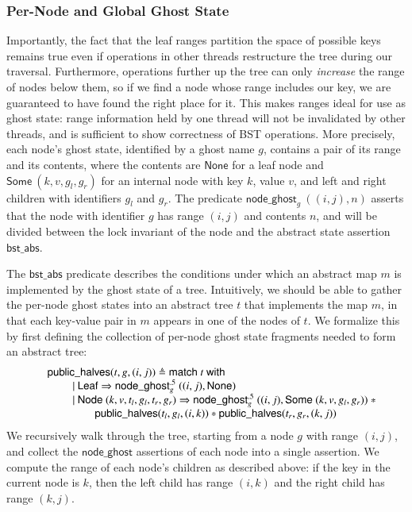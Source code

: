 \documentclass[runningheads]{llncs}
\newcommand{\treerep}{\ensuremath{\mathsf{bst\_abs}}}
\newcommand{\nodeghost}[2]{\ensuremath{\mathsf{node\_ghost}_{#1}\ (#2)}}
\newcommand{\publichalf}[2]{\ensuremath{\mathsf{node\_ghost}^{.5}_{#1}\ (#2)}}
\begin{document}
\subsubsection{Per-Node and Global Ghost State}
Importantly, the fact that the leaf ranges partition the space of possible keys remains true even if operations in other threads restructure the tree during our traversal. Furthermore, operations further up the tree can only \emph{increase} the range of nodes below them, so if we find a node whose range includes our key, we are guaranteed to have found the right place for it. This makes ranges ideal for use as ghost state: range information held by one thread will not be invalidated by other threads, and is sufficient to show correctness of BST operations. More precisely, each node's ghost state, identified by a ghost name $g$, contains a pair of its range and its contents, where the contents are $\mathsf{None}$ for a leaf node and $\mathsf{Some}\ (k, v, g_l, g_r)$ for an internal node with key $k$, value $v$, and left and right children with identifiers $g_l$ and $g_r$. The predicate $\nodeghost{g}{(i, j), n}$ asserts that the node with identifier $g$ has range $(i, j)$ and contents $n$, and will be divided between the lock invariant of the node and the abstract state assertion $\treerep$.

The $\treerep$ predicate describes the conditions under which an abstract map $m$ is implemented by the ghost state of a tree. Intuitively, we should be able to gather the per-node ghost states into an abstract tree $t$ that implements the map $m$, in that each key-value pair in $m$ appears in one of the nodes of $t$. We formalize this by first defining the collection of per-node ghost state fragments needed to form an abstract tree:
\[\begin{array}{r l}
& \mathsf{public\_halves}(t, g, (i, j)) \triangleq \mathsf{match}\ t\ \mathsf{with}\\
& \;\qquad |\ \mathsf{Leaf} \Rightarrow \publichalf{g}{(i, j), \mathsf{None}}\\
& \;\qquad |\ \mathsf{Node}\ (k, v, t_l, g_l, t_r, g_r) \Rightarrow \publichalf{g}{(i, j), \mathsf{Some}\ (k, v, g_l, g_r)}\ * \\
& \;\qquad \qquad\mathsf{public\_halves}(t_l, g_l, (i, k)) * \mathsf{public\_halves}(t_r, g_r, (k, j))
\end{array}\]
We recursively walk through the tree, starting from a node $g$ with range $(i, j)$, and collect the $\mathsf{node\_ghost}$ assertions of each node into a single assertion. We compute the range of each node's children as described above: if the key in the current node is $k$, then the left child has range $(i, k)$ and the right child has range $(k, j)$.
\end{document}
